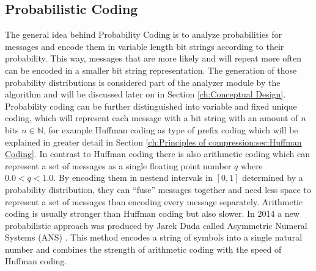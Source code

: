\subsection{Probabilistic Coding}
\par{
The general idea behind Probability Coding is to analyze probabilities for messages and encode them in variable length bit strings according to their probability. This way, messages that are more likely and will repeat more often can be encoded in a smaller bit string representation. The generation of those probability distributions is considered part of the analyzer module by the algorithm and will be discussed later on in Section \ref{ch:Conceptual Design}. Probability coding can be further distinguished into variable and fixed unique coding, which will represent each message with a bit string with an amount of $n$ bits $n \in \mathbb{N}$, for example Huffman coding as type of prefix coding which will be explained in greater detail in Section \ref{ch:Principles of compression:sec:Huffman Coding}. In contrast to Huffman coding there is also arithmetic coding which can represent a set of messages as a single floating point number $q$ where $0.0 < q < 1.0$. By encoding them in nestend intervals in $[0,1]$ determined by a probability distribution, they can \enquote{fuse} messages together and need less space to represent a set of messages than encoding every message separately. Arithmetic coding is usually stronger than Huffman coding but also slower. In 2014 a new probabilistic approach was produced by Jarek Duda called Asymmetric Numeral Systems (ANS) \cite{DBLP:journals/corr/Duda13}. This method encodes a string of symbols into a single natural number and combines the strength of arithmetic coding with the speed of Huffman coding.
}

